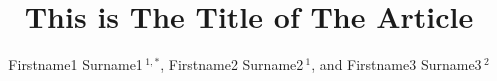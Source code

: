 \documentclass[utf8]{my_class_1_frontiers_vanc}  %
\def\Authors{
        Firstname1 Surname1\,$^{1,*}$,
        Firstname2 Surname2\,$^{1}$, and 
        Firstname3 Surname3\,$^{2}$
        }
\def\firstAuthorLast{Firstname1 {et~al.}} %
\begin{document}

\onecolumn
{}

\title[This Is The Running Title]{This is The Title of The Article} 

\author[\firstAuthorLast ]{\Authors} 
\address{} 
\correspondence{} 

\extraAuth{}%

\maketitle %
\end{document}
